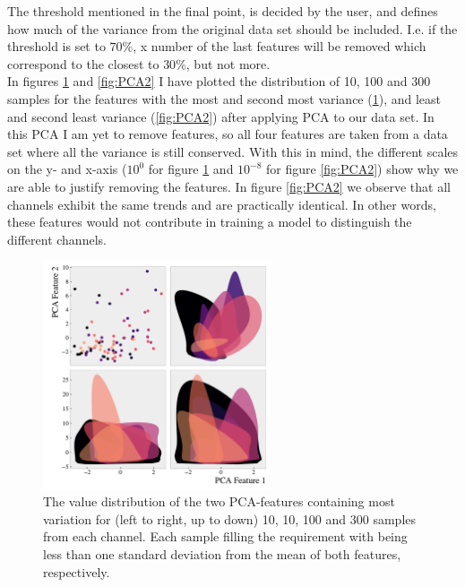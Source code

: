 The threshold mentioned in the final point, is decided by the user, and defines how much of the variance from the original data 
set should be included. I.e. if the threshold is set to $70\%$, x number of the last features will be removed which correspond to 
the closest to $30\%$, but not more.
\\
In figures \ref{fig:PCA1} and \ref{fig:PCA2} I have plotted the distribution of 10, 100 and 300 samples 
for the features with the most and second most variance (\ref{fig:PCA1}), and least and second least 
variance (\ref{fig:PCA2}) after applying \ac{PCA} to our data set. In this \ac{PCA} I am yet to remove features, 
so all four features are taken from a data set where all the variance is still conserved. With this in 
mind, the different scales on the y- and x-axis ($10^0$ for figure \ref{fig:PCA1} and $10^{-8}$ for figure 
\ref{fig:PCA2}) show why we are able to justify removing the features. In figure \ref{fig:PCA2} we observe 
that all channels exhibit the same trends and are practically identical. In other words, these features 
would not contribute in training a model to distinguish the different channels.
\begin{figure}
    \centering
    \includegraphics[width=0.6\textwidth]{Figures/MLResults/DataHandling/PCA/PCAPlotFirst.pdf}
    \caption[The value distribution of the two leading PCA-features.]{The value distribution of the two PCA-features containing most variation for (left to right, 
    up to down) 10, 10, 100 and 300 samples from each channel. Each sample filling the requirement 
    with being less than one standard deviation from the mean of both features, respectively.}
    \label{fig:PCA1}
\end{figure}
